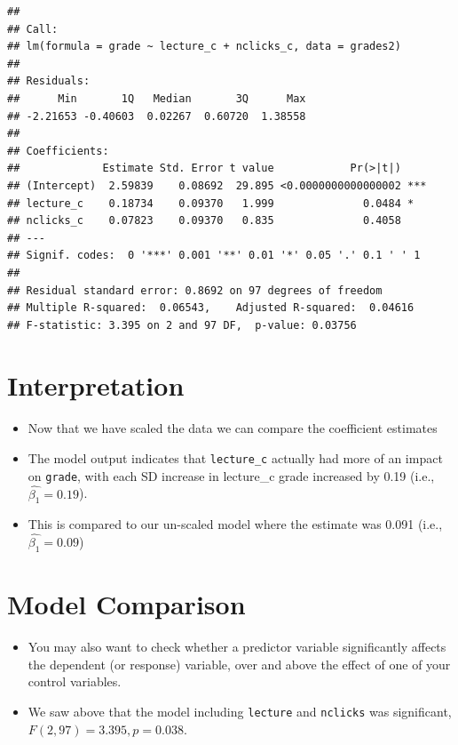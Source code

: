 \documentclass[
]{article}
\providecommand{\tightlist}{%
  \setlength{\itemsep}{0pt}\setlength{\parskip}{0pt}}
\begin{document}
\begin{verbatim}
## 
## Call:
## lm(formula = grade ~ lecture_c + nclicks_c, data = grades2)
## 
## Residuals:
##      Min       1Q   Median       3Q      Max 
## -2.21653 -0.40603  0.02267  0.60720  1.38558 
## 
## Coefficients:
##             Estimate Std. Error t value            Pr(>|t|)    
## (Intercept)  2.59839    0.08692  29.895 <0.0000000000000002 ***
## lecture_c    0.18734    0.09370   1.999              0.0484 *  
## nclicks_c    0.07823    0.09370   0.835              0.4058    
## ---
## Signif. codes:  0 '***' 0.001 '**' 0.01 '*' 0.05 '.' 0.1 ' ' 1
## 
## Residual standard error: 0.8692 on 97 degrees of freedom
## Multiple R-squared:  0.06543,    Adjusted R-squared:  0.04616 
## F-statistic: 3.395 on 2 and 97 DF,  p-value: 0.03756
\end{verbatim}

\hypertarget{interpretation}{%
\section{Interpretation}\label{interpretation}}

\begin{itemize}
\tightlist
\item
  Now that we have scaled the data we can compare the coefficient
  estimates
\item
  The model output indicates that \texttt{lecture\_c} actually had more
  of an impact on \texttt{grade}, with each SD increase in lecture\_c
  grade increased by 0.19 (i.e., \(\hat{\beta_1}=0.19\)).
\item
  This is compared to our un-scaled model where the estimate was 0.091
  (i.e., \(\hat{\beta_1}=0.09\))
\end{itemize}

\hypertarget{model-comparison}{%
\section{Model Comparison}\label{model-comparison}}

\begin{itemize}
\tightlist
\item
  You may also want to check whether a predictor variable significantly
  affects the dependent (or response) variable, over and above the
  effect of one of your control variables.
\item
  We saw above that the model including \texttt{lecture} and
  \texttt{nclicks} was significant, \(F(2,97) = 3.395, p = 0.038\).
\end{itemize}
\end{document}
